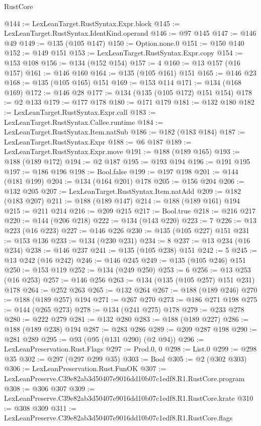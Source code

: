 \begin{lexlean}{RustCore}
\begin{coremodule}
@144 := LexLeanTarget.RustSyntax.Expr.block
@145 := LexLeanTarget.RustSyntax.IdentKind.operand
@146 := @97 @145
@147 := @146 @49
@149 := @135 (@105 @147)
@150 := Option.none.{0}
@151 := @150 @140
@152 := @149 @151
@153 := LexLeanTarget.RustSyntax.Expr.copy
@154 := @153 @108
@156 := @134 (@152 @154)
@157 := 4
@160 := @13 @157 (@16 @157)
@161 := @146 @160
@164 := @135 (@105 @161) @151
@165 := @146 @23
@168 := @135 (@105 @165) @151
@169 := @153 @114
@171 := @134 (@168 @169)
@172 := @146 @28
@177 := @134 (@135 (@105 @172) @151 @154)
@178 := @2 @133
@179 := @177 @178
@180 := @171 @179
@181 := @132 @180
@182 := LexLeanTarget.RustSyntax.Expr.call
@183 := LexLeanTarget.RustSyntax.Callee.runtime
@184 := LexLeanTarget.RustSyntax.Item.natSub
@186 := @182 (@183 @184)
@187 := LexLeanTarget.RustSyntax.Expr
@188 := @6 @187
@189 := LexLeanTarget.RustSyntax.Expr.move
@191 := @188 (@189 @165)
@193 := @188 (@189 @172)
@194 := @2 @187
@195 := @193 @194
@196 := @191 @195
@197 := @186 @196
@198 := Bool.false
@199 := @197 @198
@201 := @144 (@181 @199)
@204 := @134 (@164 @201) @178
@205 := @156 @204
@206 := @132 @205
@207 := LexLeanTarget.RustSyntax.Item.natAdd
@209 := @182 (@183 @207)
@211 := @188 (@189 @147)
@214 := @188 (@189 @161) @194
@215 := @211 @214
@216 := @209 @215
@217 := Bool.true
@218 := @216 @217
@220 := @144 (@206 @218)
@222 := @134 (@143 @220)
@223 := 7
@226 := @13 @223 (@16 @223)
@227 := @146 @226
@230 := @135 (@105 @227) @151
@231 := @153 @136
@233 := @134 (@230 @231)
@234 := 8
@237 := @13 @234 (@16 @234)
@238 := @146 @237
@241 := @135 (@105 @238) @151
@242 := 5
@245 := @13 @242 (@16 @242)
@246 := @146 @245
@249 := @135 (@105 @246) @151
@250 := @153 @119
@252 := @134 (@249 @250)
@253 := 6
@256 := @13 @253 (@16 @253)
@257 := @146 @256
@263 := @134 (@135 (@105 @257) @151 @231) @178
@264 := @252 @263
@265 := @132 @264
@267 := @188 (@189 @246)
@270 := @188 (@189 @257) @194
@271 := @267 @270
@273 := @186 @271 @198
@275 := @144 (@265 @273)
@278 := @134 (@241 @275) @178
@279 := @233 @278
@280 := @222 @279
@281 := @132 @280
@283 := @188 (@189 @227)
@286 := @188 (@189 @238) @194
@287 := @283 @286
@289 := @209 @287 @198
@290 := @281 @289
@295 := @93 (@95 (@131 @290) (@2 @94))
@296 := LexLeanPreservation.Rust.Flags
@297 := Prod.{0, 0}
@298 := List.{0}
@299 := @298 @35
@302 := @297 (@297 @299 @35)
@303 := Bool
@305 := @2 (@302 @303)
@306 := LexLeanPreservation.Rust.FunOK
@307 := LexLeanPreserve.C39e82ab3d50407e9016dd10b07c1edf8.R1.RustCore.program
@308 := @306 @307
@309 := LexLeanPreserve.C39e82ab3d50407e9016dd10b07c1edf8.R1.RustCore.krate
@310 := @308 @309
@311 := LexLeanPreserve.C39e82ab3d50407e9016dd10b07c1edf8.R1.RustCore.flags

\end{coremodule}
\end{lexlean}
